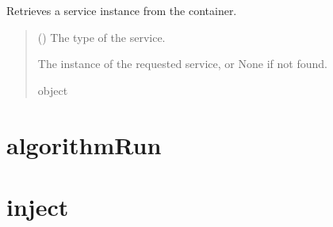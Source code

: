 \documentclass[letterpaper,10pt,english]{sphinxmanual}
\begin{document}
\begin{fulllineitems}
\begin{fulllineitems}
\begin{quote}
\begin{description}
\begin{itemize}
\end{itemize}

\end{description}\end{quote}

\end{fulllineitems}


\begin{fulllineitems}
\label{\detokenize{modules:DependencyContainer.DependencyContainer.get_service}}
\pysigstartsignatures
{}
\pysigstopsignatures
\sphinxAtStartPar
Retrieves a service instance from the container.
\begin{quote}\begin{description}
\sphinxAtStartPar
{} () \textendash{} The type of the service.

\sphinxAtStartPar
The instance of the requested service, or None if not found.

\sphinxAtStartPar
object

\end{description}\end{quote}

\end{fulllineitems}


\end{fulllineitems}



\section{algorithmRun}
\label{\detokenize{modules:algorithmrun}}

\section{inject}
\label{\detokenize{modules:module-inject}}\label{\detokenize{modules:inject}}
\end{document}
